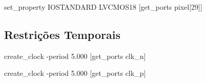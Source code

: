 {%
%
%
%
%
%
%
%
%
%
%
%
%
%
%
%
%
%
%
%
%
%
%
%
%
%
%
%
%
set\_property IOSTANDARD LVCMOS18 [get\_ports {pixel[29]}]}

\subsection{Restrições Temporais} \label{ap2:planA_timing_cnstrs}

\small{

create\_clock -period 5.000 [get\_ports clk\_n]

create\_clock -period 5.000 [get\_ports clk\_p]}

